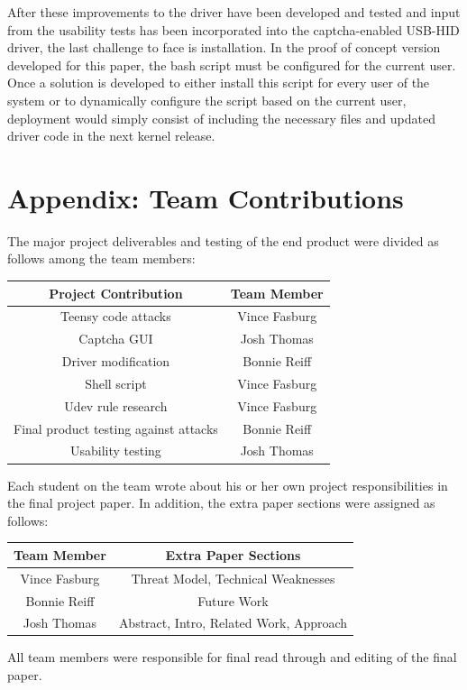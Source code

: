 \documentclass[pagenumbers]{ieee}
\begin{document}
After these improvements to the driver have been developed and tested and input from the usability tests has been incorporated into the captcha-enabled USB-HID driver, the last challenge to face is installation. In the proof of concept version developed for this paper, the bash script must be configured for the current user. Once a solution is developed to either install this script for every user of the system or to dynamically configure the script based on the current user, deployment would simply consist of including the necessary files and updated driver code in the next kernel release.


\appendix 


\section{Appendix: Team Contributions}

The major project deliverables and testing of the end product were divided as follows among the team members:

\begin{center}
	\begin{tabular}{ | c | c | }
		\hline \textbf{Project Contribution} & \textbf{Team Member} \\ \hline
		Teensy code attacks & Vince Fasburg \\ \hline
		Captcha GUI & Josh Thomas \\ \hline
		Driver modification & Bonnie Reiff \\ \hline
		Shell script & Vince Fasburg \\ \hline
		Udev rule research & Vince Fasburg \\ \hline
		Final product testing against attacks & Bonnie Reiff \\ \hline
		Usability testing & Josh Thomas \\ \hline
	\end{tabular}
\end{center}

Each student on the team wrote about his or her own project responsibilities in the final project paper. In addition, the extra paper sections were assigned as follows:

\begin{center}
	\begin{tabular}{ | c | c | }
		\hline \textbf{Team Member} & \textbf{Extra Paper Sections} \\ \hline
		Vince Fasburg & Threat Model, Technical Weaknesses \\ \hline
		Bonnie Reiff &  Future Work \\ \hline
		Josh Thomas & Abstract, Intro, Related Work, Approach  \\ \hline
	\end{tabular}
\end{center}

 All team members were responsible for final read through and editing of the final paper.




\end{document}
